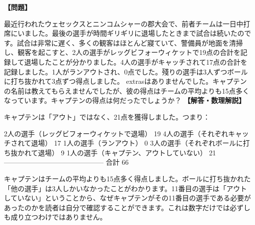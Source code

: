 \documentclass[10pt,a4paper,oneside,openany]{ltjsbook}
\begin{document}
\begin{tcolorbox}[colback=softblue,colframe=primaryblue,title=\textbf{第 388 問：スローブリッジ （原題: SLOW CRICKET.）},arc=2mm,boxrule=1pt,breakable]
\textbf{【問題】}\par\vspace{0.3em}
最近行われたウェセックスとニンコムシャーの郡大会で、前者チームは一日中打席にいました。最後の選手が時間ギリギリに退場したときまで試合は続いたのです。試合は非常に遅く、多くの観客はほとんど寢ていて、警備員が地面を清掃し、観客を起こすと、2人の選手がレッグビフォーウィケットで19点の合計を記録して退場したことが分かりました。4人の選手がキャッチされて17点の合計を記録しました。1人がランアウトされ、0点でした。殘りの選手は3人ずつボールに打ち抜かれて3点ずつ得点しました。 extrasはありませんでした。キャプテンの名前は教えてもらえませんでしたが、彼の得点はチームの平均よりも15点多くなっています。キャプテンの得点は何だったでしょうか？
\tcblower
\textbf{【解答・数理解説】}\par\vspace{0.3em}
キャプテンは「アウト」ではなく、21点を獲得しました。つまり：

    2人の選手（レッグビフォーウィケットで退場）         19
    4人の選手（それぞれキャッチされて退場）              17
    1人の選手（ランアウト）                                0
    3人の選手（それぞれボールに打ち抜かれて退場）          9
    1人の選手（キャプテン、アウトしていない）             21
    --------------------------------------------
    合計                                                  66

キャプテンはチームの平均よりも15点多く得点しました。ボールに打ち抜かれた「他の選手」は3人しかいなかったことがわかります。11番目の選手は「アウトしていない」ということから、なぜキャプテンがその11番目の選手である必要があったのかを読者は自分で確認することができます。これは数字だけでは必ずしも成り立つわけではありません。
\end{tcolorbox}
\end{document}
